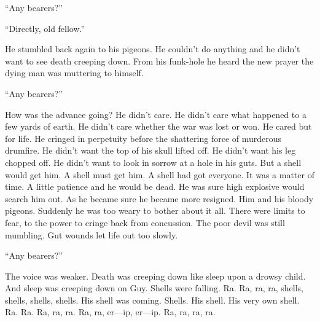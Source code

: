 ``Any bearers?''

``Directly, old fellow.''

He stumbled back again to his pigeons. He couldn't do anything and he didn't want to see death creeping down. From his funk-hole he heard the new prayer the dying man was muttering to himself.

``Any bearers?''

How was the advance going? He didn't care. He didn't care what happened to a few yards of earth. He didn't care whether the war was lost or won. He cared but for life. He cringed in perpetuity before the shattering force of murderous drumfire. He didn't want the top of his skull lifted off. He didn't want his leg chopped off. He didn't want to look in sorrow at a hole in his guts. But a shell would get him. A shell must get him. A shell had got everyone. It was a matter of time. A little patience and he would be dead. He was sure high explosive would search him out. As he became sure he became more resigned. Him and his bloody pigeons. Suddenly he was too weary to bother about it all. There were limits to fear, to the power to cringe back from concussion. The poor devil was still mumbling. Gut wounds let life out too slowly.

``Any bearers?''

The voice was weaker. Death was creeping down like sleep upon a drowsy child. And sleep was creeping down on Guy. Shells were falling. Ra. Ra, ra, ra, shells, shells, shells, shells. His shell was coming. Shells. His shell. His very own shell. Ra. Ra. Ra, ra, ra. Ra, ra, er---ip, er---ip. Ra, ra, ra, ra.




